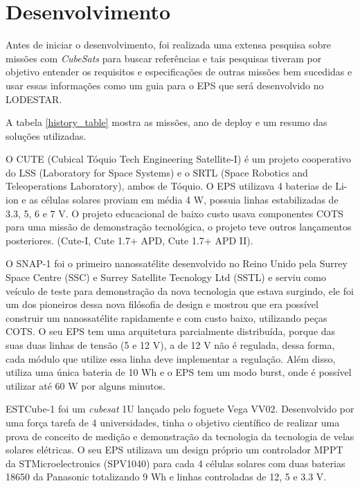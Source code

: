 \chapter{Desenvolvimento} \label{desenvolvimento}

Antes de iniciar o desenvolvimento, foi realizada uma extensa pesquisa sobre missões com \textit{CubeSats} para buscar referências e tais pesquisas tiveram por objetivo entender os requisitos e especificações de outras missões bem sucedidas e usar essas informações como um guia para o EPS que será desenvolvido no LODESTAR. 

A tabela \ref{history_table} mostra as missões, ano de deploy e um resumo das soluções utilizadas.



O CUTE \cite{cute1_ref} (Cubical  Tóquio  Tech  Engineering  Satellite-I) é um projeto cooperativo do LSS (Laboratory for Space Systems) e o SRTL (Space Robotics and Teleoperations Laboratory), ambos de Tóquio. O EPS utilizava 4 baterias de Li-ion e as células solares proviam em média 4 W, possuia linhas estabilizadas de 3.3, 5, 6 e 7 V. O  projeto  educacional  de  baixo  custo  usava componentes COTS para uma missão de demonstração tecnológica, o projeto teve outros lançamentos posteriores. (Cute-I, Cute 1.7+ APD, Cute 1.7+ APD II). 

O SNAP-1 \cite{snap1_ref} foi o primeiro nanossatélite desenvolvido no Reino Unido pela Surrey Space Centre (SSC) e Surrey Satellite Tecnology Ltd (SSTL) e serviu como veículo de teste para demonstração da nova tecnologia que estava surgindo, ele foi um dos pioneiros dessa nova filósofia de design e mostrou que era possível construir um nanossatélite rapidamente e com custo baixo, utilizando peças COTS. O seu EPS tem uma arquitetura parcialmente distribuída, porque das suas duas linhas de tensão (5 e 12 V), a de 12 V não é regulada, dessa forma, cada módulo que utilize essa linha deve implementar a regulação. Além disso, utiliza uma única bateria de 10 Wh e o EPS tem um modo burst, onde é possível utilizar até 60 W por alguns minutos.

ESTCube-1 \cite{estcube1_ref} foi um \textit{cubesat} 1U lançado pelo foguete Vega VV02. Desenvolvido por uma força tarefa de 4 universidades, tinha o objetivo científico de realizar uma prova de conceito de medição e demonstração da tecnologia da tecnologia de velas solares elétricas. O seu EPS utilizava um design próprio um controlador MPPT da STMicroelectronics (SPV1040) para cada 4 células solares com duas baterias 18650 da Panasonic totalizando 9 Wh e linhas controladas de 12, 5 e 3.3 V.


